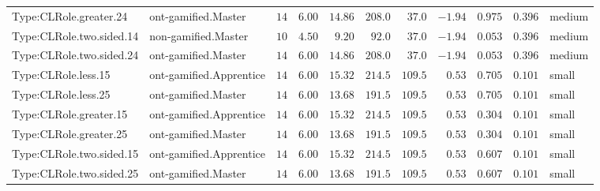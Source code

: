 \documentclass[6pt,a4paper]{article}
\begin{document}
{\begin{longtable}{llrrrrrrrrl}
Type:CLRole.greater.24&ont-gamified.Master&$14$&$6.00$&$14.86$&$208.0$&$ 37.0$&$-1.94$&$0.975$&$0.396$&medium\tabularnewline
Type:CLRole.two.sided.14&non-gamified.Master&$10$&$4.50$&$ 9.20$&$ 92.0$&$ 37.0$&$-1.94$&$0.053$&$0.396$&medium\tabularnewline
Type:CLRole.two.sided.24&ont-gamified.Master&$14$&$6.00$&$14.86$&$208.0$&$ 37.0$&$-1.94$&$0.053$&$0.396$&medium\tabularnewline
Type:CLRole.less.15&ont-gamified.Apprentice&$14$&$6.00$&$15.32$&$214.5$&$109.5$&$ 0.53$&$0.705$&$0.101$&small\tabularnewline
Type:CLRole.less.25&ont-gamified.Master&$14$&$6.00$&$13.68$&$191.5$&$109.5$&$ 0.53$&$0.705$&$0.101$&small\tabularnewline
Type:CLRole.greater.15&ont-gamified.Apprentice&$14$&$6.00$&$15.32$&$214.5$&$109.5$&$ 0.53$&$0.304$&$0.101$&small\tabularnewline
Type:CLRole.greater.25&ont-gamified.Master&$14$&$6.00$&$13.68$&$191.5$&$109.5$&$ 0.53$&$0.304$&$0.101$&small\tabularnewline
\newpage
Type:CLRole.two.sided.15&ont-gamified.Apprentice&$14$&$6.00$&$15.32$&$214.5$&$109.5$&$ 0.53$&$0.607$&$0.101$&small\tabularnewline
Type:CLRole.two.sided.25&ont-gamified.Master&$14$&$6.00$&$13.68$&$191.5$&$109.5$&$ 0.53$&$0.607$&$0.101$&small\tabularnewline
\hline
\end{longtable}}
\end{document}
